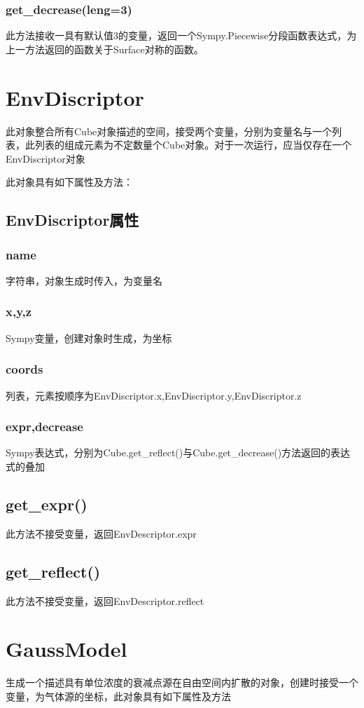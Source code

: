 \documentclass[]{ctexart}
\begin{document}
\subsubsection{get\_decrease(leng=3)}
此方法接收一具有默认值3的变量，返回一个Sympy.Piecewise分段函数表达式，为上一方法返回的函数关于Surface对称的函数。
\section{EnvDiscriptor}
此对象整合所有Cube对象描述的空间，接受两个变量，分别为变量名与一个列表，此列表的组成元素为不定数量个Cube对象。对于一次运行，应当仅存在一个EnvDiscriptor对象

此对象具有如下属性及方法：
\subsection{EnvDiscriptor属性}
\subsubsection{name}
字符串，对象生成时传入，为变量名
\subsubsection{x,y,z}
Sympy变量，创建对象时生成，为坐标
\subsubsection{coords}
列表，元素按顺序为EnvDiscriptor.x,EnvDiscriptor.y,EnvDiscriptor.z
\subsubsection{expr,decrease}
Sympy表达式，分别为Cube.get\_reflect()与Cube.get\_decrease()方法返回的表达式的叠加
\subsection{get\_expr()}
此方法不接受变量，返回EnvDescriptor.expr
\subsection{get\_reflect()}
此方法不接受变量，返回EnvDescriptor.reflect

\section{GaussModel}
生成一个描述具有单位浓度的衰减点源在自由空间内扩散的对象，创建时接受一个变量，为气体源的坐标，此对象具有如下属性及方法
\end{document}
